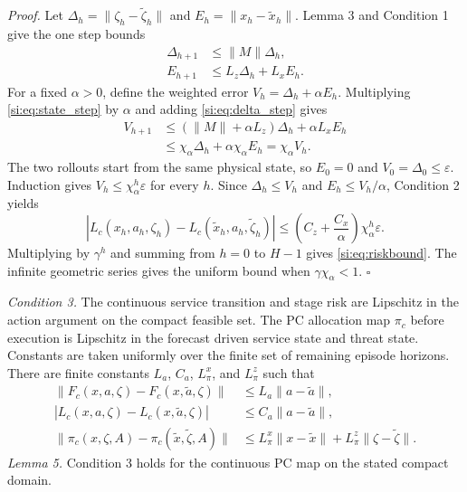 \textit{Proof.}  Let
$\Delta_h=\|\zeta_h-\tilde\zeta_h\|$ and
$E_h=\|x_h-\tilde x_h\|$.  Lemma 3 and Condition 1 give the one step bounds
\begin{align}
\Delta_{h+1} &\le \|M\|\Delta_h, \label{si:eq:delta_step}\\
E_{h+1} &\le L_z\Delta_h+L_xE_h . \label{si:eq:state_step}
\end{align}
For a fixed $\alpha>0$, define the weighted error
$V_h=\Delta_h+\alpha E_h$.  Multiplying \eqref{si:eq:state_step} by $\alpha$ and
adding \eqref{si:eq:delta_step} gives
\begin{align}
V_{h+1}
&\le (\|M\|+\alpha L_z)\Delta_h
+\alpha L_xE_h \nonumber\\
&\le \chi_{\alpha}\Delta_h+\alpha\chi_{\alpha}E_h
=\chi_{\alpha}V_h .
\end{align}
The two rollouts start from the same physical state, so $E_0=0$ and
$V_0=\Delta_0\le\varepsilon$.  Induction gives
$V_h\le\chi_{\alpha}^h\varepsilon$ for every $h$.  Since
$\Delta_h\le V_h$ and $E_h\le V_h/\alpha$, Condition 2 yields
\begin{equation}
|L_c(x_h,a_h,\zeta_h)-L_c(\tilde x_h,a_h,\tilde\zeta_h)|
\le
\left(C_z+\frac{C_x}{\alpha}\right)
\chi_{\alpha}^h\varepsilon .
\end{equation}
Multiplying by $\gamma^h$ and summing from $h=0$ to $H-1$ gives
\eqref{si:eq:riskbound}.  The infinite geometric series gives the uniform bound
when $\gamma\chi_{\alpha}<1$.  \hfill $\square$

\textit{Condition 3.}  The continuous service transition and stage risk are
Lipschitz in the action argument on the compact feasible set.  The PC allocation
map $\pi_c$ before execution is Lipschitz in the forecast driven service state
and threat state.  Constants are taken uniformly over the finite set of
remaining episode horizons.
There are finite constants $L_a$, $C_a$, $L_{\pi}^x$, and $L_{\pi}^{z}$ such
that
\begin{align}
\|F_c(x,a,\zeta)-F_c(x,\tilde a,\zeta)\|&\le L_a\|a-\tilde a\|,\\
|L_c(x,a,\zeta)-L_c(x,\tilde a,\zeta)|&\le C_a\|a-\tilde a\|,\\
\|\pi_c(x,\zeta,A)-\pi_c(\tilde x,\tilde\zeta,A)\|
&\le L_{\pi}^x\|x-\tilde x\|+L_{\pi}^{z}\|\zeta-\tilde\zeta\|.
\end{align}
\textit{Lemma 5.}  Condition 3 holds for the continuous PC map on the stated
compact domain.

